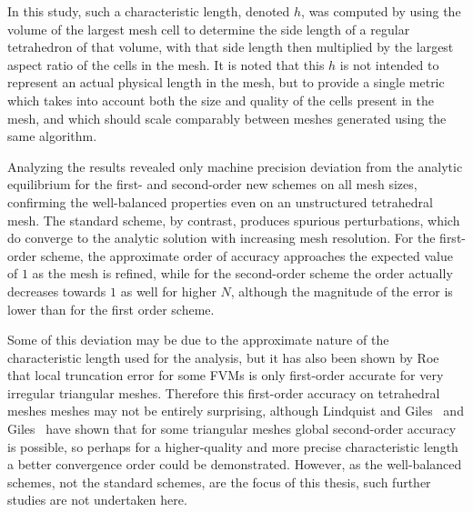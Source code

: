 In this study, such a characteristic length, denoted $h$, was computed by using the volume of the largest mesh cell to determine the side length of a regular tetrahedron of that volume, with that side length then multiplied by the largest aspect ratio of the cells in the mesh. It is noted that this $h$ is not intended to represent an actual physical length in the mesh, but to provide a single metric which takes into account both the size and quality of the cells present in the mesh, and which should scale comparably between meshes generated using the same algorithm.

Analyzing the results revealed only machine precision deviation from the analytic equilibrium for the first- and second-order new schemes on all mesh sizes, confirming the well-balanced properties even on an unstructured tetrahedral mesh. The standard scheme, by contrast, produces spurious perturbations, which do converge to the analytic solution with increasing mesh resolution. For the first-order scheme, the approximate order of accuracy approaches the expected value of $1$ as the mesh is refined, while for the second-order scheme the order actually decreases towards $1$ as well for higher $N$, although the magnitude of the error is lower than for the first order scheme.

Some of this deviation may be due to the approximate nature of the characteristic length used for the analysis, but it has also been shown by Roe~\cite{Roe1987} that local truncation error for some FVMs is only first-order accurate for very irregular triangular meshes. Therefore this first-order accuracy on tetrahedral meshes meshes may not be entirely surprising, although Lindquist and Giles~\cite{Lindquist1989} and Giles~\cite{Giles1989} have shown that for some triangular meshes global second-order accuracy is possible, so perhaps for a higher-quality and more precise characteristic length a better convergence order could be demonstrated. However, as the well-balanced schemes, not the standard schemes, are the focus of this thesis, such further studies are not undertaken here.
